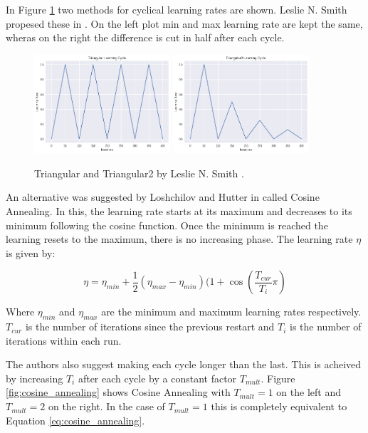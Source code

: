 In Figure \ref{fig:triangular_cyclical_learning_rate} two methods for cyclical learning rates are shown.
Leslie N. Smith propesed these in \cite{Smith_2015}.
On the left plot min and max learning rate are kept the same, wheras on the right the difference is cut in half after each cycle.


\begin{figure}[hbtp!]
    \centering
    \includegraphics[width=0.45\textwidth]{./img/triangular.png}
    \includegraphics[width=0.45\textwidth]{./img/triangular2.png}
    \caption{Triangular and Triangular2 by Leslie N. Smith \cite{Smith_2015}.}
    \label{fig:triangular_cyclical_learning_rate}
\end{figure}

An alternative was suggested by Loshchilov and Hutter in \cite{Loshchilov_Hutter_2016} called Cosine Annealing.
In this, the learning rate starts at its maximum and decreases to its minimum following the cosine function.
Once the minimum is reached the learning resets to the maximum, there is no increasing phase.
The learning rate $\eta$ is given by:

\begin{equation}
    \eta = \eta_{min} + \frac{1}{2}(\eta_{max} - \eta_{min})(1 + \cos(\frac{T_{cur}}{T_i}\pi)
    \label{eq:cosine_annealing}
\end{equation}

Where $\eta_{min}$ and $\eta_{max}$ are the minimum and maximum learning rates respectively.
$T_{cur}$ is the number of iterations since the previous restart and $T_i$ is the number of iterations within each run.

The authors also suggest making each cycle longer than the last.
This is acheived by increasing $T_i$ after each cycle by a constant factor $T_{mult}$.
Figure \ref{fig:cosine_annealing} shows Cosine Annealing with $T_{mult}=1$ on the left and $T_{mult}=2$ on the right.
In the case of $T_{mult}=1$ this is completely equivalent to Equation \ref{eq:cosine_annealing}.

